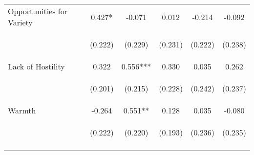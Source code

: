 \begin{tabular}{lccccc}
\noalign{\smallskip}Opportunities for Variety & 0.427* & -0.071 & 0.012 & -0.214 & -0.092\\
 & \begin{footnotesize}(0.222)\end{footnotesize} & \begin{footnotesize}(0.229)\end{footnotesize} & \begin{footnotesize}(0.231)\end{footnotesize} & \begin{footnotesize}(0.222)\end{footnotesize} & \begin{footnotesize}(0.238)\end{footnotesize}\\
\noalign{\smallskip}Lack of Hostility & 0.322 & 0.556*** & 0.330 & 0.035 & 0.262\\
 & \begin{footnotesize}(0.201)\end{footnotesize} & \begin{footnotesize}(0.215)\end{footnotesize} & \begin{footnotesize}(0.228)\end{footnotesize} & \begin{footnotesize}(0.242)\end{footnotesize} & \begin{footnotesize}(0.237)\end{footnotesize}\\
\noalign{\smallskip}Warmth & -0.264 & 0.551** & 0.128 & 0.035 & -0.080\\
 & \begin{footnotesize}(0.222)\end{footnotesize} & \begin{footnotesize}(0.220)\end{footnotesize} & \begin{footnotesize}(0.193)\end{footnotesize} & \begin{footnotesize}(0.236)\end{footnotesize} & \begin{footnotesize}(0.235)\end{footnotesize}\\
\noalign{\smallskip}\hline\end{tabular}\\
